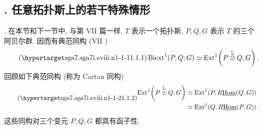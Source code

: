 \subsection*{. 任意拓扑斯上的若干特殊情形}

. 在本节和下一节中, 与第 VII 篇一样, $T$ 表示一个拓扑斯, $P,Q,G$ 表示 $T$ 的三个阿贝尔群. 因而有典范同构 (VII )
\begin{equation}\tag{\SGARefTarget{sga7.sga7i.eviii.n1-1-1}{1.1.1}}
 \Biext^1(P,Q;G)
 \simeq
 \Ext^1\!\left(P\mathbin{\overset{\mathbb L}{\otimes}}Q,G\right).
\end{equation}
回顾如下典范同构 (称为 Cartan 同构)
\begin{equation}\tag{\SGARefTarget{sga7.sga7i.eviii.n1-1-2}{1.1.2}}
\begin{split}
 \Ext^1\!\left(P\mathbin{\overset{\mathbb L}{\otimes}}Q,G\right)
 &\simeq \Ext^1\!\left(P,R\uHom(Q,G)\right)\\
 &\simeq \Ext^1\!\left(Q,R\uHom(P,G)\right).
\end{split}
\end{equation}
这些同构对三个变元 $P,Q,G$ 都具有函子性.

